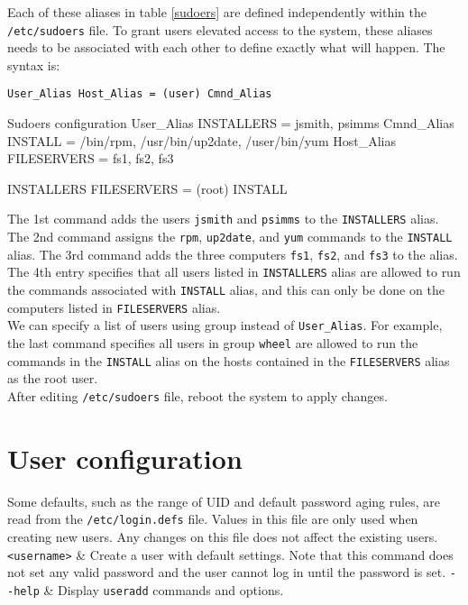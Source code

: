 Each of these aliases in table \ref{sudoers} are defined independently within the \verb|/etc/sudoers| file. To grant users elevated access to the system, these aliases needs to be associated with each other to define exactly what will happen. The syntax is:

\begin{verbatim}
User_Alias Host_Alias = (user) Cmnd_Alias
\end{verbatim}

\begin{sexylisting}{Sudoers configuration}
User_Alias INSTALLERS = jsmith, psimms
Cmnd_Alias INSTALL = /bin/rpm, /usr/bin/up2date, /user/bin/yum
Host_Alias FILESERVERS = fs1, fs2, fs3

INSTALLERS FILESERVERS = (root) INSTALL
\end{sexylisting}

The 1st command adds the users \verb|jsmith| and \verb|psimms| to the \verb|INSTALLERS| alias. The 2nd command assigns the \verb|rpm|, \verb|up2date|, and \verb|yum| commands to the \verb|INSTALL| alias. The 3rd command adds the three computers \verb|fs1|, \verb|fs2|, and \verb|fs3| to the alias. The 4th entry specifies that all users listed in \verb|INSTALLERS| alias are allowed to run the commands associated with \verb|INSTALL| alias, and this can only be done on the computers listed in \verb|FILESERVERS| alias. \\

We can specify a list of users using group instead of \verb|User_Alias|. For example, the last command specifies all users in group \verb|wheel| are allowed to run the commands in the \verb|INSTALL| alias on the hosts contained in the \verb|FILESERVERS| alias as the root user. \\

After editing \verb|/etc/sudoers| file, reboot the system to apply changes.

\section{User configuration}

Some defaults, such as the range of UID and default password aging rules, are read from the \verb|/etc/login.defs| file. Values in this file are only used when creating new users. Any changes on this file does not affect the existing users.\\

\tableCmdStart
{}
\verb|<username>| & Create a user with default settings. Note that this command does not set any valid password and the user cannot log in until the password is set.\w
\verb|--help| & Display \verb|useradd| commands and options.\w

